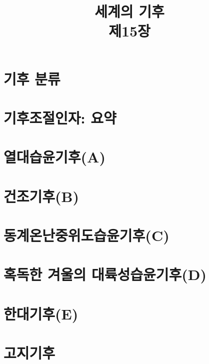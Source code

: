 \title[]{세계의 기후\\\small{제15장}}

\begin{frame}[plain] %
	\titlepage
\end{frame}


\section{기후 분류}


\section{기후조절인자: 요약}

\section{열대습윤기후(A)}

\section{건조기후(B)}

\section{동계온난중위도습윤기후(C)}

\section{혹독한 겨울의 대륙성습윤기후(D)}

\section{한대기후(E)}

\section{고지기후}
